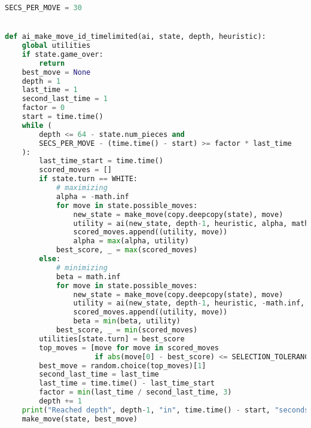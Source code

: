 \begin{lstlisting}[language=Python]
SECS_PER_MOVE = 30


def ai_make_move_id_timelimited(ai, state, depth, heuristic):
    global utilities
    if state.game_over:
        return
    best_move = None
    depth = 1
    last_time = 1
    second_last_time = 1
    factor = 0
    start = time.time()
    while (
        depth <= 64 - state.num_pieces and
        SECS_PER_MOVE - (time.time() - start) >= factor * last_time
    ):
        last_time_start = time.time()
        scored_moves = []
        if state.turn == WHITE:
            # maximizing
            alpha = -math.inf
            for move in state.possible_moves:
                new_state = make_move(copy.deepcopy(state), move)
                utility = ai(new_state, depth-1, heuristic, alpha, math.inf)
                scored_moves.append((utility, move))
                alpha = max(alpha, utility)
            best_score, _ = max(scored_moves)
        else:
            # minimizing
            beta = math.inf
            for move in state.possible_moves:
                new_state = make_move(copy.deepcopy(state), move)
                utility = ai(new_state, depth-1, heuristic, -math.inf, beta)
                scored_moves.append((utility, move))
                beta = min(beta, utility)
            best_score, _ = min(scored_moves)
        utilities[state.turn] = best_score
        top_moves = [move for move in scored_moves
                     if abs(move[0] - best_score) <= SELECTION_TOLERANCE]
        best_move = random.choice(top_moves)[1]
        second_last_time = last_time
        last_time = time.time() - last_time_start
        factor = min(last_time / second_last_time, 3)
        depth += 1
    print("Reached depth", depth-1, "in", time.time() - start, "seconds")
    make_move(state, best_move)
\end{lstlisting}
